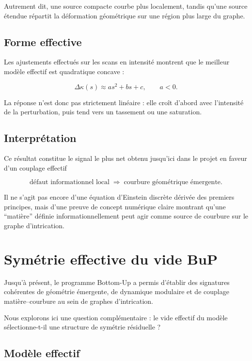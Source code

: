 \documentclass[11pt]{article}
\begin{document}
Autrement dit, une source compacte courbe plus localement, tandis qu'une source étendue répartit la déformation géométrique sur une région plus large du graphe.

\subsection{Forme effective}

Les ajustements effectués sur les scans en intensité montrent que le meilleur modèle effectif est quadratique concave :

\[
\Delta \kappa(s)\approx as^2+bs+c,
\qquad a<0.
\]

La réponse n'est donc pas strictement linéaire : elle croît d'abord avec l'intensité de la perturbation, puis tend vers un tassement ou une saturation.

\subsection{Interprétation}

Ce résultat constitue le signal le plus net obtenu jusqu'ici dans le projet en faveur d'un couplage effectif

\[
\text{défaut informationnel local}
\;\Longrightarrow\;
\text{courbure géométrique émergente}.
\]

Il ne s'agit pas encore d'une équation d'Einstein discrète dérivée des premiers principes, mais d'une preuve de concept numérique claire montrant qu'une ``matière'' définie informationnellement peut agir comme source de courbure sur le graphe d'intrication.


\section{Symétrie effective du vide BuP}

Jusqu'à présent, le programme Bottom-Up a permis d'établir des signatures cohérentes de géométrie émergente, de dynamique modulaire et de couplage matière--courbure au sein de graphes d'intrication.

Nous explorons ici une question complémentaire : le vide effectif du modèle sélectionne-t-il une structure de symétrie résiduelle ?

\subsection{Modèle effectif}
\end{document}
